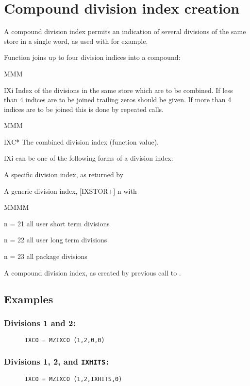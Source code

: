 \section{Compound division index creation}
\par A compound division index permits an indication of several divisions
of the same store in a single word,
as used with  for example.
\par Function  joins up to four division indices into a compound:
\Idesc
\begin{DL}{MMM}
\item[IXi]Index of the divisions in the same store which are to be
combined.
If less than 4 indices are to be joined trailing zeros
should be given.
If more than 4 indices are to be joined this is done by
repeated calls.
\end{DL}
\Odesc
\begin{DL}{MMM}
\item[IXC*]The combined division index (function value).
\end{DL}
\par IXi can be one of the following forms of a division index:
\begin{OL}
\item A specific division index, as returned by 
\item A generic division index, [IXSTOR+] n with
\begin{DL}{MMMM}
\item[n = 21]all user short term divisions
\item[n = 22]all user long  term divisions
\item[n = 23]all package divisions
\end{DL}
\item A compound division index, as created by previous call to .
\end{OL}
\subsection{Examples}
\subsubsection{Divisions 1 and 2:}
\begin{verbatim}
      IXCO = MZIXCO (1,2,0,0)
\end{verbatim}
\subsubsection{Divisions 1, 2, and \tt IXHITS:}
\begin{verbatim}
      IXCO = MZIXCO (1,2,IXHITS,0)
\end{verbatim}
